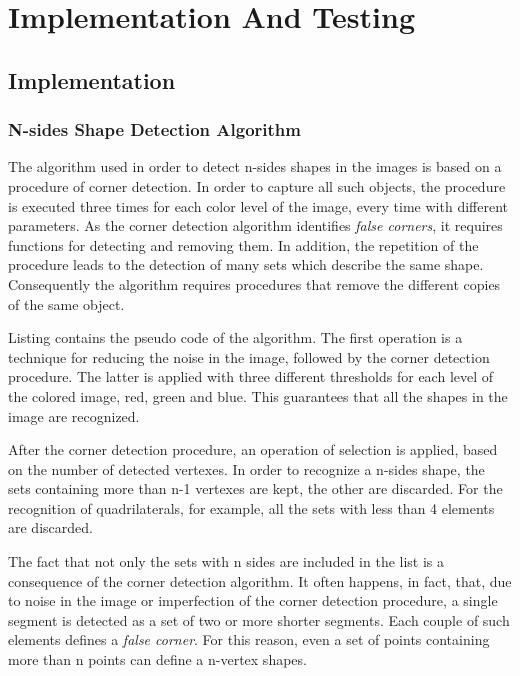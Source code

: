 \chapter{Implementation And Testing}\label{impl_test}
	
	\section{Implementation}
	
		\subsection{N-sides Shape Detection Algorithm}
		The algorithm used in order to detect n-sides shapes in the images is based on a procedure of corner detection. 
		In order to capture all such objects, the procedure is executed three times for each color level of the image, every time with different parameters.
		As the corner detection algorithm identifies \emph{false corners}, it requires functions for detecting and removing them. 
		In addition, the repetition of the procedure leads to the detection of many sets which describe the same shape.	
		Consequently the algorithm requires procedures that remove the different copies of the same object.


		
		Listing \todo{} contains the pseudo code of the algorithm.
		The first operation is a technique for reducing the noise in the image, followed by the corner detection procedure.
		The latter is applied with three different thresholds for each level of the colored image, red, green and blue.
		This guarantees that all the shapes in the image are recognized.
		


		After the corner detection procedure, an operation of selection is applied, based on the number of detected vertexes.
		In order to recognize a n-sides shape, the sets containing more than n-1 vertexes are kept, the other are discarded.
		For the recognition of quadrilaterals, for example, all the sets with less than 4 elements are discarded.
		


		The fact that not only the sets with n sides are included in the list is a consequence of the corner detection algorithm. 
		It often happens, in fact, that, due to noise in the image or imperfection of the corner detection procedure, a single segment is detected as a set of two or more shorter segments. 
		Each couple of such elements defines a \emph{false corner}. 
		For this reason, even a set of points containing more than n points can define a n-vertex shapes. 
		
